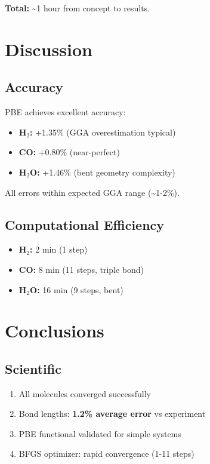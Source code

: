 \documentclass[11pt,a4paper]{article}
\begin{document}
\textbf{Total:} \textasciitilde1 hour from concept to results.

\section{Discussion}

\subsection{Accuracy}

PBE achieves excellent accuracy:
\begin{itemize}
    \item \textbf{H$_2$:} +1.35\% (GGA overestimation typical)
    \item \textbf{CO:} +0.80\% (near-perfect)
    \item \textbf{H$_2$O:} +1.46\% (bent geometry complexity)
\end{itemize}

All errors within expected GGA range (\textasciitilde1-2\%).

\subsection{Computational Efficiency}

\begin{itemize}
    \item \textbf{H$_2$:} 2 min (1 step)
    \item \textbf{CO:} 8 min (11 steps, triple bond)
    \item \textbf{H$_2$O:} 16 min (9 steps, bent)
\end{itemize}

\section{Conclusions}

\subsection{Scientific}

\begin{enumerate}
    \item All molecules converged successfully
    \item Bond lengths: \textbf{1.2\% average error} vs experiment
    \item PBE functional validated for simple systems
    \item BFGS optimizer: rapid convergence (1-11 steps)
\end{enumerate}
\end{document}
